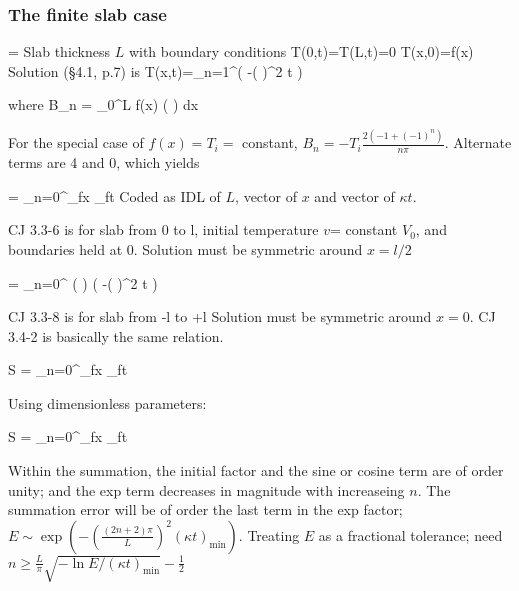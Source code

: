 \subsubsection{The finite slab case}

\qb {}= \kappa {} \qe
Slab thickness $L$ with boundary conditions 
\qb  T(0,t)=T(L,t)=0   T(x,0)=f(x) \qe
Solution (\S 4.1, p.7) is
\qb T(x,t)=\sum_{n=1}^\infty {} \exp \left( -\left(  \right)^2 \kappa t \right) \qe

where \qb B_n = \int_0^L f(x) \sin \left(  \right) dx\qe

For the special case of $f(x)=T_i =$ constant, $ B_n=-T_i\frac{ 2 (-1+(-1)^n)}{n \pi} $. Alternate terms are 4 and 0, which yields

\qb {}= \sum_{n=0}^\infty {}_{fx} _{ft} \qe
 Coded as IDL  of $L$, vector of $x$ and vector of $\kappa t$.


CJ 3.3-6 is for  slab from 0 to l, initial temperature $v$= constant $V_0$, and boundaries held at 0. Solution must be symmetric around $x=l/2$


\qb {}= \sum_{n=0}^\infty {} \sin \left( \right) \exp \left( -\left(  \right)^2 \kappa t \right)   \qe

CJ 3.3-8 is for slab from -l to +l Solution must be symmetric around $x=0$. CJ 3.4-2 is basically the same relation. 
 
\qbn {} \equiv S = \sum_{n=0}^\infty  {}_{fx}  _{ft}    

Using dimensionless parameters:

\qb S = \sum_{n=0}^\infty  {}_{fx}  _{ft}  \qe


Within the summation, the initial factor and the sine or cosine term are of
order unity; and the exp term decreases in magnitude with increaseing $n$. The
summation error will be of order the last term in the exp factor;
$E \sim \exp \left( - \left( \frac{(2n+2) \pi}{L} \right)^2 (\kappa t)_\mathrm{min} \right) $.  
Treating $E$ as a fractional tolerance; need 
$ n \geq \frac{L}{\pi} \sqrt{-\ln E / (\kappa t)_\mathrm{min} } -\frac{1}{2}$


